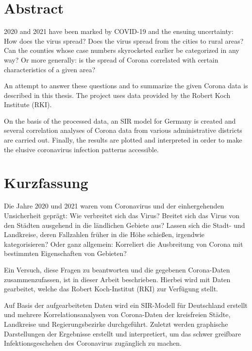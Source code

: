 \chapter*{Abstract}
2020 and 2021 have been marked by COVID-19 and the ensuing uncertainty:
How does the virus spread? Does the virus spread from the cities to rural areas? Can the counties whose case numbers skyrocketed earlier be categorized in any way? Or more generally: is the spread of Corona correlated with certain characteristics of a given area?

An attempt to answer these questions and to summarize the given Corona data is described in this thesis. The project uses data provided by the Robert Koch Institute (RKI).

On the basis of the processed data, an SIR model for Germany is created and several correlation analyses of Corona data from various administrative districts are carried out.
Finally, the results are plotted and interpreted in order to make the elusive coronavirus infection patterns accessible.

\chapter*{Kurzfassung}
Die Jahre 2020 und 2021 waren vom Coronavirus und der einhergehenden Unsicherheit geprägt:
Wie verbreitet sich das Virus? Breitet sich das Virus von den Städten ausgehend in die ländlichen Gebiete aus? Lassen sich die Stadt- und Landkreise, deren Fallzahlen früher in die Höhe schießen, irgendwie kategorisieren? Oder ganz allgemein: Korreliert die Ausbreitung von Corona mit bestimmten Eigenschaften von Gebieten?

Ein Versuch, diese Fragen zu beantworten und die gegebenen Corona-Daten zusammenzufassen, ist in dieser Arbeit beschrieben. Hierbei wird mit Daten gearbeitet, welche das Robert Koch-Institut (RKI) zur Verfügung stellt.

Auf Basis der aufgearbeiteten Daten wird ein SIR-Modell für Deutschland erstellt und mehrere Korrelationsanalysen von Corona-Daten der kreisfreien Städte, Landkreise und Regierungsbezirke durchgeführt.
Zuletzt werden graphische Darstellungen der Ergebnisse erstellt und interpretiert, um das schwer greifbare Infektionsgeschehen des Coronavirus zugänglich zu machen.
\newpage